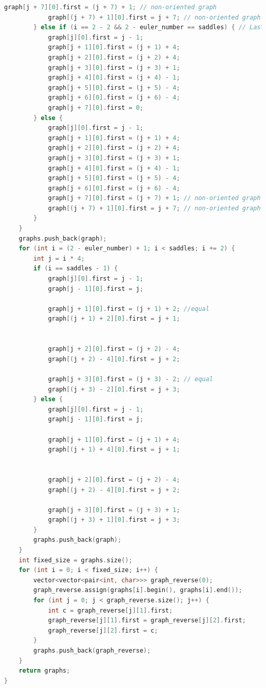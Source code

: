\begin{lstlisting}[language=C++]
			graph[j + 7][0].first = (j + 7) + 1; // non-oriented graph
			graph[(j + 7) + 1][0].first = j + 7; // non-oriented graph
		} else if (i == 2 - 2 && 2 - euler_number == saddles) { // Last step
			graph[j][0].first = j - 1;
			graph[j + 1][0].first = (j + 1) + 4;
			graph[j + 2][0].first = (j + 2) + 4;
			graph[j + 3][0].first = (j + 3) + 1;
			graph[j + 4][0].first = (j + 4) - 1;
			graph[j + 5][0].first = (j + 5) - 4;
			graph[j + 6][0].first = (j + 6) - 4;
			graph[j + 7][0].first = 0;
		} else {
			graph[j][0].first = j - 1;
			graph[j + 1][0].first = (j + 1) + 4;
			graph[j + 2][0].first = (j + 2) + 4;
			graph[j + 3][0].first = (j + 3) + 1;
			graph[j + 4][0].first = (j + 4) - 1;
			graph[j + 5][0].first = (j + 5) - 4;
			graph[j + 6][0].first = (j + 6) - 4;
			graph[j + 7][0].first = (j + 7) + 1; // non-oriented graph
			graph[(j + 7) + 1][0].first = j + 7; // non-oriented graph
		}
	}
	graphs.push_back(graph);
	for (int i = (2 - euler_number) + 1; i < saddles; i += 2) {
		int j = i * 4;
		if (i == saddles - 1) {
			graph[j][0].first = j - 1;
			graph[j - 1][0].first = j;
			
			graph[j + 1][0].first = (j + 1) + 2; //equal
			graph[(j + 1) + 2][0].first = j + 1;
			
			
			graph[j + 2][0].first = (j + 2) - 4;
			graph[(j + 2) - 4][0].first = j + 2;
			
			graph[j + 3][0].first = (j + 3) - 2; // equal
			graph[(j + 3) - 2][0].first = j + 3;
		} else {
			graph[j][0].first = j - 1;
			graph[j - 1][0].first = j;
			
			graph[j + 1][0].first = (j + 1) + 4;
			graph[(j + 1) + 4][0].first = j + 1;
			
			
			graph[j + 2][0].first = (j + 2) - 4;
			graph[(j + 2) - 4][0].first = j + 2;
			
			graph[j + 3][0].first = (j + 3) + 1;
			graph[(j + 3) + 1][0].first = j + 3;
		}
		graphs.push_back(graph);
	}
	int fixed_size = graphs.size();
	for (int i = 0; i < fixed_size; i++) {
		vector<vector<pair<int, char>>> graph_reverse(0);
		graph_reverse.assign(graphs[i].begin(), graphs[i].end());
		for (int j = 0; j < graph_reverse.size(); j++) {
			int c = graph_reverse[j][1].first;
			graph_reverse[j][1].first = graph_reverse[j][2].first;
			graph_reverse[j][2].first = c;
		}
		graphs.push_back(graph_reverse);
	}
	return graphs;
}
\end{lstlisting}
